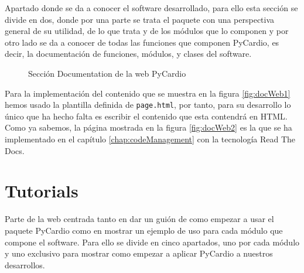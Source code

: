 Apartado donde se da a conocer el software desarrollado, para ello esta sección se divide en dos, donde por una parte se trata el paquete con una perspectiva general de su utilidad, de lo que trata y de los módulos que lo componen y por otro lado se da a conocer de todas las funciones que componen PyCardio, es decir, la documentación de funciones, módulos, y clases del software.

\begin{figure}[H]
    \centering
    \caption{Sección Documentation de la web PyCardio}
    \label{fig:docWeb}
\end{figure}


Para la implementación del contenido que se muestra en la figura \ref{fig:docWeb1} hemos usado la plantilla definida de \texttt{page.html}, por tanto, para su desarrollo lo único que ha hecho falta es escribir el contenido que esta contendrá en HTML. Como ya sabemos, la página mostrada en la figura \ref{fig:docWeb2} es la que se ha implementado en el capítulo \ref{chap:codeManagement} con la tecnología Read The Docs.



\section{Tutorials}
\label{sec:tutoWeb}

Parte de la web centrada  tanto en dar un guión de como empezar a usar el paquete PyCardio como en mostrar un ejemplo de uso para cada módulo que compone el software. Para ello se divide en cinco apartados, uno por cada módulo y uno exclusivo para mostrar como empezar a aplicar PyCardio a nuestros desarrollos.

